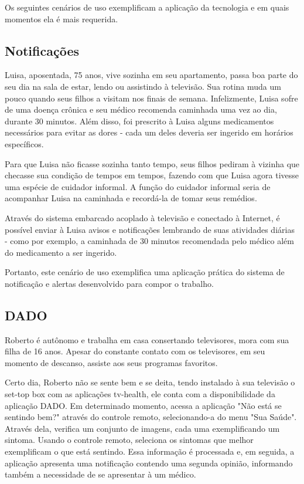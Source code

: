 Os seguintes cenários de uso exemplificam a aplicação da tecnologia e em quais
momentos ela é mais requerida.

\subsection{Notificações}\label{subsec:notificacoes}

Luisa, aposentada, 75 anos, vive sozinha em seu apartamento, passa boa parte do
seu dia na sala de estar, lendo ou assistindo à televisão. Sua rotina muda um
pouco quando seus filhos a visitam nos finais de semana. Infelizmente, Luisa
sofre de uma doença crônica e seu médico recomenda caminhada uma vez ao dia,
durante 30 minutos. Além disso, foi prescrito à Luisa alguns medicamentos
necessários para evitar as dores - cada um deles deveria ser ingerido em
horários específicos.

Para que Luisa não ficasse sozinha tanto tempo, seus filhos pediram à vizinha
que checasse sua condição de tempos em tempos, fazendo com que Luisa agora tivesse uma
espécie de cuidador informal. A função do cuidador informal seria de acompanhar
Luisa na caminhada e recordá-la de tomar seus remédios.

Através do sistema embarcado acoplado à televisão e conectado à Internet, é
possível enviar à Luisa avisos e notificações lembrando de suas atividades
diárias - como por exemplo, a caminhada de 30 minutos recomendada pelo
médico além do medicamento a ser ingerido.

Portanto, este cenário de uso exemplifica uma aplicação prática do sistema de
notificação e alertas desenvolvido para compor o trabalho.

\subsection{DADO}\label{subsec:dado}

Roberto é autônomo e trabalha em casa consertando televisores, mora com sua
filha de 16 anos. Apesar do constante contato com os televisores, em seu momento
de descanso, assiste aos seus programas favoritos.

Certo dia, Roberto não se sente bem e se deita, tendo instalado à sua televisão
o set-top box com as aplicações tv-health, ele conta com a disponibilidade da
aplicação DADO. Em determinado momento, acessa a aplicação "Não está se sentindo
bem?" através do controle remoto, selecionando-a do menu "Sua Saúde". Através
dela, verifica um conjunto de imagens, cada uma exemplificando um sintoma.
Usando o controle remoto, seleciona os sintomas que melhor exemplificam o que
está sentindo. Essa informação é processada e, em seguida, a aplicação apresenta
uma notificação contendo uma segunda opinião, informando também a necessidade de
se apresentar à um médico.

